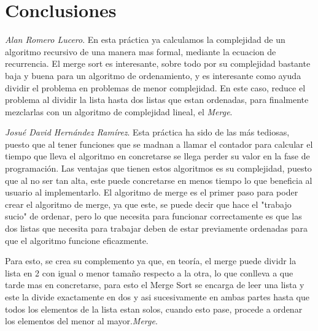\documentclass[12pt,twoside]{article}
\begin{document}
\section{Conclusiones}



\textit{Alan Romero Lucero}. En esta pr\'actica ya calculamos la complejidad de un algoritmo recursivo de una manera mas formal, mediante la ecuacion de recurrencia. El merge sort es interesante, sobre todo por su complejidad bastante baja y buena para un algoritmo de ordenamiento, y es interesante como ayuda dividir el problema en problemas de menor complejidad. En este caso, reduce el problema al dividir la lista hasta dos listas que estan ordenadas, para finalmente mezclarlas con un algoritmo de complejidad lineal, el \textit{Merge}.


\textit{Josu\'e David Hern\'andez Ram\'irez}. Esta pr\'actica ha sido de las m\'as tediosas, puesto que al tener funciones que se madnan a llamar el contador para calcular el tiempo que lleva el algoritmo en concretarse se llega perder su valor en la fase de programación. Las ventajas que tienen estos algoritmos es su complejidad, puesto que al no ser tan alta, este puede concretarse en menos tiempo lo que beneficia al usuario al implementarlo. El algoritmo de merge es el primer paso para poder crear el algoritmo de merge, ya que este, se puede decir que hace el "trabajo sucio" de ordenar, pero lo que necesita para funcionar correctamente es que las dos listas que necesita para trabajar deben de estar previamente ordenadas para que el algoritmo funcione eficazmente.

Para esto, se crea su complemento ya que, en teoría, el merge puede dividr la lista en 2 con igual o menor tamaño respecto a la otra, lo que conlleva a que tarde mas en concretarse, para esto el Merge Sort se encarga de leer una lista y este la divide exactamente en dos y asi sucesivamente en ambas partes hasta que todos los elementos de la lista estan solos, cuando esto pase, procede a ordenar los elementos del menor al mayor.\textit{Merge}.
 
\newpage
\vfill
\clearpage
\end{document}
